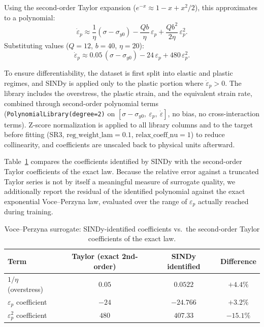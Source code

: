 \documentclass{article}
\begin{document}
Using the second-order Taylor expansion ($e^{-x}\approx 1 - x + x^2/2$), this approximates to a polynomial:
\begin{equation}
    \dot{\varepsilon}_p \approx \frac{1}{\eta}(\sigma - \sigma_{y0}) - \frac{Qb}{\eta}\,\varepsilon_p + \frac{Qb^2}{2\eta}\,\varepsilon_p^2.
    \label{eq:voce_taylor}
\end{equation}
Substituting values ($Q=12$, $b=40$, $\eta=20$):
\begin{equation}
    \dot{\varepsilon}_p \approx 0.05\,(\sigma - \sigma_{y0}) - 24\,\varepsilon_p + 480\,\varepsilon_p^2.
    \label{eq:voce_taylor_num}
\end{equation}

To ensure differentiability, the dataset is first split into elastic and plastic regimes, and SINDy is applied only to the plastic portion where $\dot{\varepsilon}_p > 0$. The library includes the overstress, the plastic strain, and the equivalent strain rate, combined through second-order polynomial terms (\texttt{PolynomialLibrary(degree=2)} on $[\sigma-\sigma_{y0},\ \varepsilon_p,\ \dot\varepsilon]$, no bias, no cross-interaction terms). Z-score normalization is applied to all library columns and to the target before fitting (SR3, $\text{reg\_weight\_lam}=0.1$, $\text{relax\_coeff\_nu}=1$) to reduce collinearity, and coefficients are unscaled back to physical units afterward.

Table~\ref{tab:voce_coeffs} compares the coefficients identified by SINDy with the second-order Taylor coefficients of the exact law. Because the relative error against a truncated Taylor series is not by itself a meaningful measure of surrogate quality, we additionally report the residual of the identified polynomial against the exact exponential Voce--Perzyna law, evaluated over the range of $\varepsilon_p$ actually reached during training.

\begin{table}[h]
\centering
\caption{Voce--Perzyna surrogate: SINDy-identified coefficients vs.\ the second-order Taylor coefficients of the exact law.}
\label{tab:voce_coeffs}
\begin{tabular}{lccc}
\toprule
Term & Taylor (exact 2nd-order) & SINDy identified & Difference \\
\midrule
$1/\eta$ (overstress) & $0.05$ & $0.0522$ & $+4.4\%$ \\
$\varepsilon_p$ coefficient & $-24$ & $-24.766$ & $+3.2\%$ \\
$\varepsilon_p^2$ coefficient & $480$ & $407.33$ & $-15.1\%$ \\
\bottomrule
\end{tabular}
\end{table}
\end{document}
